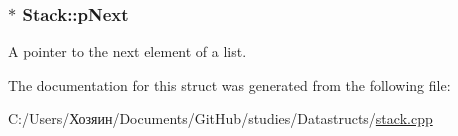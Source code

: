 \subsubsection[{p\+Next}]{$\ast$ Stack\+::p\+Next}\label{struct_stack_ad214ffe54ccc5862f3f6d57ea920f0bd}


A pointer to the next element of a list. 



The documentation for this struct was generated from the following file\+:\begin{DoxyCompactItemize}
\item 
C\+:/\+Users/Хозяин/\+Documents/\+Git\+Hub/studies/\+Datastructs/\hyperlink{stack_8cpp}{stack.\+cpp}\end{DoxyCompactItemize}
